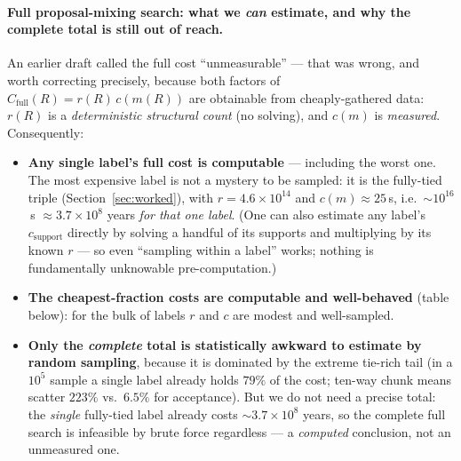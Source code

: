 \documentclass[11pt]{article}
\begin{document}
\paragraph{Full proposal-mixing search: what we \emph{can} estimate, and why the
complete total is still out of reach.} An earlier draft called the full cost
``unmeasurable'' --- that was wrong, and worth correcting precisely, because both
factors of $C_{\text{full}}(R)=r(R)\,c(m(R))$ are obtainable from cheaply-gathered
data: $r(R)$ is a \emph{deterministic structural count} (no solving), and $c(m)$ is
\emph{measured}. Consequently:
\begin{itemize}[nosep]
\item \textbf{Any single label's full cost is computable} --- including the worst one.
The most expensive label is not a mystery to be sampled: it is the fully-tied triple
(Section~\ref{sec:worked}), with $r=4.6\times10^{14}$ and $c(m)\approx25$\,s, i.e.\
$\sim10^{16}$\,s $\approx 3.7\times10^8$ years \emph{for that one label}. (One can also
estimate any label's $c_{\text{support}}$ directly by solving a handful of its
supports and multiplying by its known $r$ --- so even ``sampling within a label''
works; nothing is fundamentally unknowable pre-computation.)
\item \textbf{The cheapest-fraction costs are computable and well-behaved} (table
below): for the bulk of labels $r$ and $c$ are modest and well-sampled.
\item \textbf{Only the \emph{complete} total is statistically awkward to estimate by
random sampling}, because it is dominated by the extreme tie-rich tail (in a $10^5$
sample a single label already holds $79\%$ of the cost; ten-way chunk means scatter
$223\%$ vs.\ $6.5\%$ for acceptance). But we do not need a precise total: the
\emph{single} fully-tied label already costs $\sim3.7\times10^8$ years, so the complete
full search is infeasible by brute force regardless --- a \emph{computed} conclusion,
not an unmeasured one.
\end{itemize}
\end{document}
